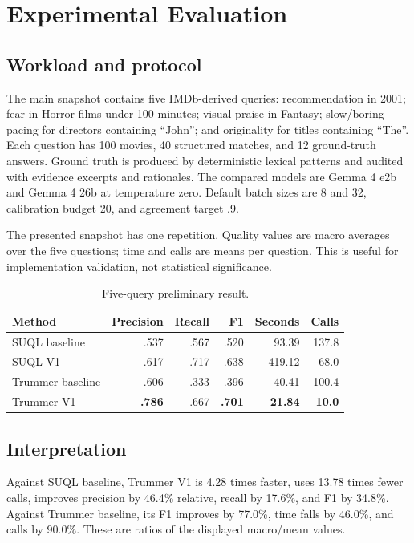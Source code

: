 \chapter{Experimental Evaluation}
\section{Workload and protocol}
The main snapshot contains five IMDb-derived queries: recommendation in 2001;
fear in Horror films under 100 minutes; visual praise in Fantasy; slow/boring
pacing for directors containing ``John''; and originality for titles containing
``The''. Each question has 100 movies, 40 structured matches, and 12 ground-truth
answers. Ground truth is produced by deterministic lexical patterns and audited
with evidence excerpts and rationales. The compared models are Gemma 4 e2b and
Gemma 4 26b at temperature zero. Default batch sizes are 8 and 32, calibration
budget 20, and agreement target .9.

The presented snapshot has one repetition. Quality values are macro averages over
the five questions; time and calls are means per question. This is useful for
implementation validation, not statistical significance.

\begin{table}[ht]\centering
\caption{Five-query preliminary result.}\small
\begin{tabular}{lrrrrr}\toprule
Method&Precision&Recall&F1&Seconds&Calls\\\midrule
SUQL baseline&.537&.567&.520&93.39&137.8\\
SUQL V1&.617&.717&.638&419.12&68.0\\
Trummer baseline&.606&.333&.396&40.41&100.4\\
Trummer V1&\textbf{.786}&.667&\textbf{.701}&\textbf{21.84}&\textbf{10.0}\\\bottomrule
\end{tabular}
\end{table}

\section{Interpretation}
Against SUQL baseline, Trummer V1 is 4.28 times faster, uses 13.78 times fewer
calls, improves precision by 46.4\% relative, recall by 17.6\%, and F1 by 34.8\%.
Against Trummer baseline, its F1 improves by 77.0\%, time falls by 46.0\%, and
calls by 90.0\%. These are ratios of the displayed macro/mean values.

